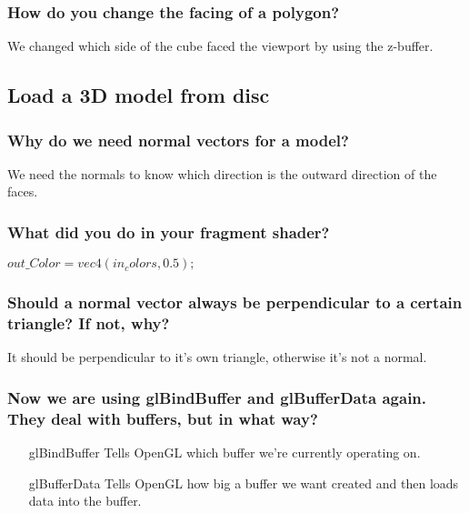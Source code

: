 \documentclass[a4paper,12pt]{article}
\begin{document}
\subsubsection{How do you change the facing of a polygon?}
We changed which side of the cube faced the viewport by using the z-buffer.

\subsection{Load a 3D model from disc}
\subsubsection{Why do we need normal vectors for a model?}
We need the normals to know which direction is the outward direction of the faces.

\subsubsection{What did you do in your fragment shader?}
  $out\_Color = vec4(in_colors, 0.5);$

\subsubsection{Should a normal vector always be perpendicular to a certain triangle? If not, why?}
It should be perpendicular to it's own triangle, otherwise it's not a normal.

\subsubsection{Now we are using glBindBuffer and glBufferData again. They deal with buffers, but in what way?}
\begin{itemize}
\item[glBindBuffer] Tells OpenGL which buffer we're currently operating on.
\item[glBufferData] Tells OpenGL how big a buffer we want created and then loads data into the buffer.
\end{itemize}
\end{document}
